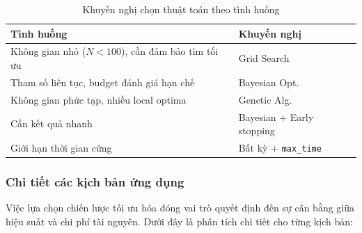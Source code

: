 \documentclass[12pt,a4paper]{article}
\begin{document}
\begin{table}[H]
\centering
\caption{Khuyến nghị chọn thuật toán theo tình huống}
\label{tab:recommendation}
\renewcommand{\arraystretch}{1.2}
\begin{tabularx}{\textwidth}{X l}
\toprule
\textbf{Tình huống} & \textbf{Khuyến nghị} \\
\midrule
Không gian nhỏ ($N < 100$), cần đảm bảo tìm tối ưu & Grid Search \\
Tham số liên tục, budget đánh giá hạn chế & Bayesian Opt. \\
Không gian phức tạp, nhiều local optima & Genetic Alg. \\
Cần kết quả nhanh & Bayesian + Early stopping \\
Giới hạn thời gian cứng & Bất kỳ + \texttt{max\_time} \\
\bottomrule
\end{tabularx}
\end{table}

\subsubsection{Chi tiết các kịch bản ứng dụng}

Việc lựa chọn chiến lược tối ưu hóa đóng vai trò quyết định đến sự cân bằng giữa hiệu suất và chi phí tài nguyên. Dưới đây là phân tích chi tiết cho từng kịch bản:
\end{document}
